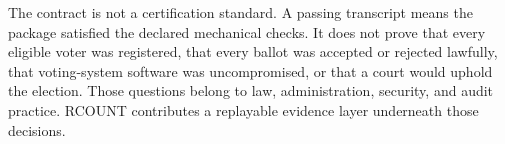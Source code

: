 The contract is not a certification standard. A passing transcript means the
package satisfied the declared mechanical checks. It does not prove that every
eligible voter was registered, that every ballot was accepted or rejected
lawfully, that voting-system software was uncompromised, or that a court would
uphold the election. Those questions belong to law, administration, security,
and audit practice. RCOUNT contributes a replayable evidence layer underneath
those decisions.
